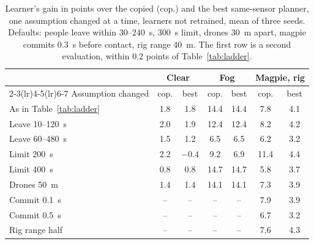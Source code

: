 \begin{table}[t]
\centering\footnotesize
\setlength{\tabcolsep}{4pt}
\caption{Learner's gain in points over the copied (cop.) and the best same-sensor planner, one assumption changed at a time, learners not retrained, mean of three seeds. Defaults: people leave within 30--240~s, 300~s limit, drones 30~m apart, magpie commits 0.3~s before contact, rig range 40~m. The first row is a second evaluation, within 0.2 points of Table~\ref{tab:ladder}.}
\label{tab:sens}
\begin{tabular}{@{}lcccccc@{}}
\toprule
 & \multicolumn{2}{c}{Clear} & \multicolumn{2}{c}{Fog} & \multicolumn{2}{c}{Magpie, rig} \\
\cmidrule(lr){2-3}\cmidrule(lr){4-5}\cmidrule(lr){6-7}
Assumption changed & cop. & best & cop. & best & cop. & best \\
\midrule
As in Table~\ref{tab:ladder} & 1.8 & 1.8 & 14.4 & 14.4 & 7.8 & 4.1 \\
Leave 10--120~s & 2.0 & 1.9 & 12.4 & 12.4 & 8.2 & 4.2 \\
Leave 60--480~s & 1.5 & 1.2 & 6.5 & 6.5 & 6.2 & 3.2 \\
Limit 200~s & 2.2 & $-0.4$ & 9.2 & 6.9 & 11.4 & 4.4 \\
Limit 400~s & 0.8 & 0.8 & 14.7 & 14.7 & 5.8 & 3.7 \\
Drones 50~m & 1.4 & 1.4 & 14.1 & 14.1 & 7.3 & 3.9 \\
Commit 0.1~s & -- & -- & -- & -- & 7.9 & 3.9 \\
Commit 0.5~s & -- & -- & -- & -- & 6.7 & 3.2 \\
Rig range half & -- & -- & -- & -- & 7.6 & 4.3 \\
\bottomrule
\end{tabular}
\end{table}
